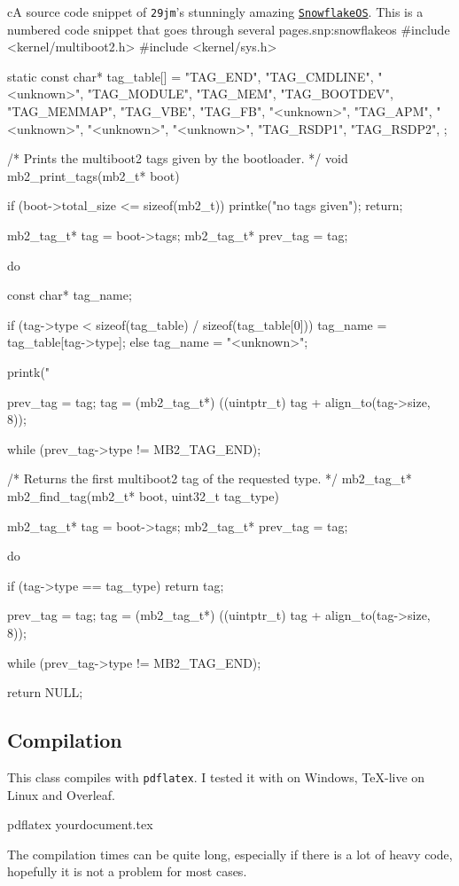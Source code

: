 \documentclass[
	raggedright,
	twoside,
	12pt,
	colorful,
]{tufte-style-article}
\begin{document}
\begin{snippetnum}{c}{A source code snippet of \texttt{29jm}'s stunningly amazing \href{https://github.com/29jm/SnowflakeOS}{\texttt{SnowflakeOS}}. This is a numbered code snippet that goes through several pages.}{snp:snowflakeos}
#include <kernel/multiboot2.h>
#include <kernel/sys.h>

static const char* tag_table[] = {
	"TAG_END",
	"TAG_CMDLINE",
	"<unknown>",
	"TAG_MODULE",
	"TAG_MEM",
	"TAG_BOOTDEV",
	"TAG_MEMMAP",
	"TAG_VBE",
	"TAG_FB",
	"<unknown>",
	"TAG_APM",
	"<unknown>",
	"<unknown>",
	"<unknown>",
	"TAG_RSDP1",
	"TAG_RSDP2",
};

/* Prints the multiboot2 tags given by the bootloader.
*/
void mb2_print_tags(mb2_t* boot) {
	if (boot->total_size <= sizeof(mb2_t)) {
		printke("no tags given");
		return;
	}

	mb2_tag_t* tag = boot->tags;
	mb2_tag_t* prev_tag = tag;

	do {
		const char* tag_name;

		if (tag->type < sizeof(tag_table) / sizeof(tag_table[0])) {
			tag_name = tag_table[tag->type];
		} else {
			tag_name = "<unknown>";
		}

		printk("%

		prev_tag = tag;
		tag = (mb2_tag_t*) ((uintptr_t) tag + align_to(tag->size, 8));
	} while (prev_tag->type != MB2_TAG_END);
}

/* Returns the first multiboot2 tag of the requested type.
*/
mb2_tag_t* mb2_find_tag(mb2_t* boot, uint32_t tag_type) {
	mb2_tag_t* tag = boot->tags;
	mb2_tag_t* prev_tag = tag;

	do {
		if (tag->type == tag_type) {
			return tag;
		}

		prev_tag = tag;
		tag = (mb2_tag_t*) ((uintptr_t) tag + align_to(tag->size, 8));
	} while (prev_tag->type != MB2_TAG_END);

	return NULL;
}
\end{snippetnum}


\subsection{Compilation}

This class compiles with \texttt{pdflatex}. I tested it with  on Windows, \TeX-live on Linux and Overleaf.
\begin{codebox}{}
pdflatex yourdocument.tex
\end{codebox}
The compilation times can be quite long, especially if there is a lot of heavy code, hopefully it is not a problem for most cases.
\end{document}
